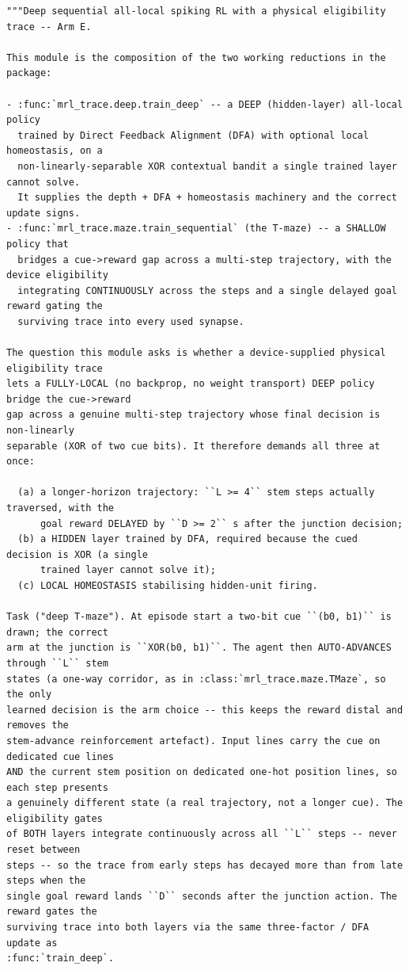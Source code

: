 \begin{lstlisting}[caption={mrl\_trace/deep\_sequential.py},label={lst:siox-src-deep_sequential}]
"""Deep sequential all-local spiking RL with a physical eligibility trace -- Arm E.

This module is the composition of the two working reductions in the package:

- :func:`mrl_trace.deep.train_deep` -- a DEEP (hidden-layer) all-local policy
  trained by Direct Feedback Alignment (DFA) with optional local homeostasis, on a
  non-linearly-separable XOR contextual bandit a single trained layer cannot solve.
  It supplies the depth + DFA + homeostasis machinery and the correct update signs.
- :func:`mrl_trace.maze.train_sequential` (the T-maze) -- a SHALLOW policy that
  bridges a cue->reward gap across a multi-step trajectory, with the device eligibility
  integrating CONTINUOUSLY across the steps and a single delayed goal reward gating the
  surviving trace into every used synapse.

The question this module asks is whether a device-supplied physical eligibility trace
lets a FULLY-LOCAL (no backprop, no weight transport) DEEP policy bridge the cue->reward
gap across a genuine multi-step trajectory whose final decision is non-linearly
separable (XOR of two cue bits). It therefore demands all three at once:

  (a) a longer-horizon trajectory: ``L >= 4`` stem steps actually traversed, with the
      goal reward DELAYED by ``D >= 2`` s after the junction decision;
  (b) a HIDDEN layer trained by DFA, required because the cued decision is XOR (a single
      trained layer cannot solve it);
  (c) LOCAL HOMEOSTASIS stabilising hidden-unit firing.

Task ("deep T-maze"). At episode start a two-bit cue ``(b0, b1)`` is drawn; the correct
arm at the junction is ``XOR(b0, b1)``. The agent then AUTO-ADVANCES through ``L`` stem
states (a one-way corridor, as in :class:`mrl_trace.maze.TMaze`, so the only
learned decision is the arm choice -- this keeps the reward distal and removes the
stem-advance reinforcement artefact). Input lines carry the cue on dedicated cue lines
AND the current stem position on dedicated one-hot position lines, so each step presents
a genuinely different state (a real trajectory, not a longer cue). The eligibility gates
of BOTH layers integrate continuously across all ``L`` steps -- never reset between
steps -- so the trace from early steps has decayed more than from late steps when the
single goal reward lands ``D`` seconds after the junction action. The reward gates the
surviving trace into both layers via the same three-factor / DFA update as
:func:`train_deep`.


\end{lstlisting}
